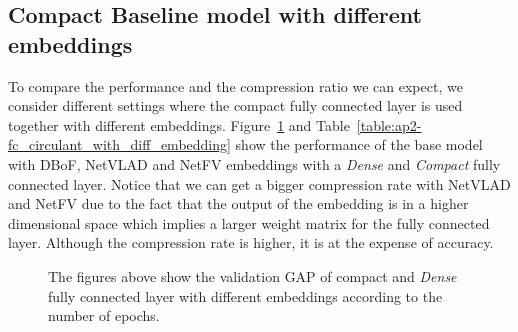 \subsection{Compact Baseline model with different embeddings}

To compare the performance and the compression ratio we can expect, we consider different settings where the compact fully connected layer is used together with different embeddings.
Figure~\ref{figure:ap2-learning_curve_circulant} and Table~\ref{table:ap2-fc_circulant_with_diff_embedding} show the performance of the base model with DBoF, NetVLAD and NetFV embeddings with a \emph{Dense} and \emph{Compact} fully connected layer.
Notice that we can get a bigger compression rate with NetVLAD and NetFV due to the fact that the output of the embedding is in a higher dimensional space which implies a larger weight matrix for the fully connected layer.
Although the compression rate is higher, it is at the expense of accuracy.

\begin{figure}[!htb]
  \centering
  
  \caption{The figures above show the validation GAP of \textmd{compact} and \emph{Dense} fully connected layer with different embeddings according to the number of epochs.}
  \label{figure:ap2-learning_curve_circulant}
\end{figure}

